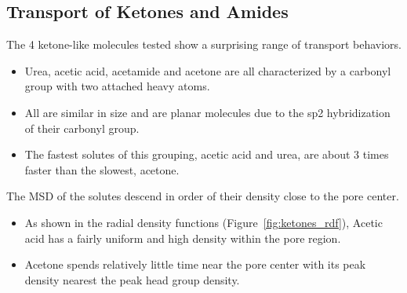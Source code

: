 \documentclass{article}
\begin{document}
  

  \subsection*{Transport of Ketones and Amides}
  
  The 4 ketone-like molecules tested show a surprising range of transport behaviors.
  \begin{itemize}
    \item Urea, acetic acid, acetamide and acetone are all characterized by a carbonyl group
    with two attached heavy atoms. 
    \item All are similar in size and are planar molecules due to the sp2 hybridization of
    their carbonyl group.
    \item The fastest solutes of this grouping, acetic acid and urea, are about
    3 times faster than the slowest, acetone. %
  \end{itemize}
  
  \noindent The MSD of the solutes descend in order of their density close to the pore center.
  \begin{itemize}
    \item As shown in the radial density functions (Figure~\ref{fig:ketones_rdf}), 
    Acetic acid has a fairly uniform and high density within the pore region.
    \item Acetone spends relatively little time near the pore center with its
    peak density nearest the peak head group density.
  \end{itemize}
  
\end{document}
